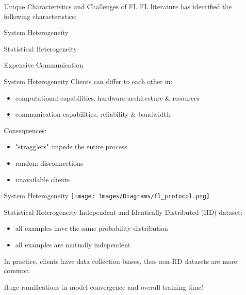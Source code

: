 \begin{frame}{Unique Characteristics and Challenges of FL}
    FL literature has identified the following characteristics:
    
    System Heterogeneity
    
    Statistical Heterogeneity
    
    Expensive Communication
\end{frame}

\begin{frame}{System Heterogeneity}
    Clients can differ to each other in:\\
	\begin{itemize}
	    \item computational capabilities, hardware architecture \& resources
	    \item communication capabilities, reliability \& bandwidth
	\end{itemize}
	Consequences:\\
	\begin{itemize}
	    \item "stragglers" impede the entire process
	    \item random disconnections
	    \item unavailable clients
	\end{itemize}
\end{frame}

\begin{frame}{System Heterogeneity}
	\centering
	\texttt{[image: Images/Diagrams/fl\_protocol.png]}\\
\end{frame}

\begin{frame}{Statistical Heterogeneity}
    Independent and Identically Distributed (IID) dataset:\\
	\begin{itemize}
	    \item all examples have the same probability distribution
	    \item all examples are mutually independent
	\end{itemize}
    
    In practice, clients have data collection biases, thus non-IID datasets are more common.
    
    Huge ramifications in model convergence and overall training time!
\end{frame}

